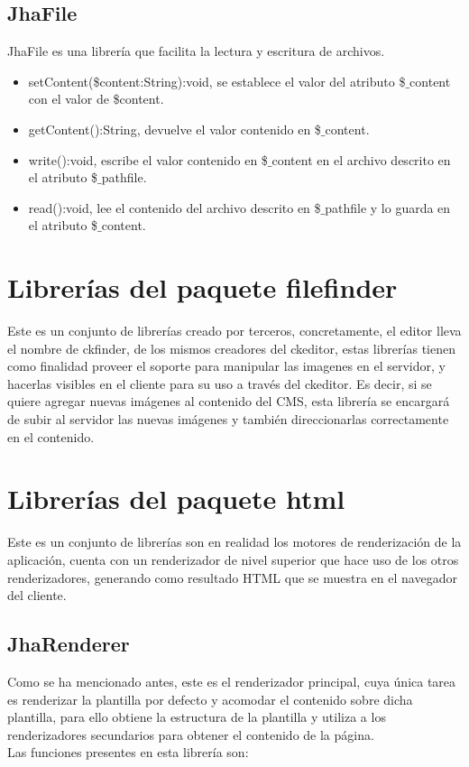\subsection{JhaFile}
JhaFile es una librer\'ia que facilita la lectura y escritura de archivos.
\begin{itemize}
\item \textsf{setContent(\$content:String):void}, se establece el valor del atributo \textsf{\$$\_$content} con el valor de \textsf{\$content}.
\item \textsf{getContent():String}, devuelve el valor contenido en \textsf{\$$\_$content}.
\item \textsf{write():void}, escribe el valor contenido en \textsf{\$$\_$content} en el archivo descrito en el atributo \textsf{\$$\_$pathfile}.
\item \textsf{read():void}, lee el contenido del archivo descrito en \textsf{\$$\_$pathfile} y lo guarda en el atributo \textsf{\$$\_$content}.
\end{itemize}

\section{Librer\'ias del paquete \textsf{filefinder}}
Este es un conjunto de librer\'ias creado por terceros, concretamente, el editor lleva el nombre de ckfinder, de los mismos creadores del ckeditor, estas librer\'ias tienen como finalidad proveer el soporte para manipular las imagenes en el servidor, y hacerlas visibles en el cliente para su uso a trav\'es del ckeditor. Es decir, si se quiere agregar nuevas im\'agenes al contenido del CMS, esta librer\'ia se encargar\'a de subir al servidor las nuevas im\'agenes y tambi\'en direccionarlas correctamente en el contenido.

\section{Librer\'ias del paquete \textsf{html}}
Este es un conjunto de librer\'ias son en realidad los motores de renderizaci\'on de la aplicaci\'on, cuenta con un renderizador de nivel superior que hace uso de los otros renderizadores, generando como resultado HTML que se muestra en el navegador del cliente.

\subsection{JhaRenderer}
Como se ha mencionado antes, este es el renderizador principal, cuya \'unica tarea es renderizar la plantilla por defecto y acomodar el contenido sobre dicha plantilla, para ello obtiene la estructura de la plantilla y utiliza a los renderizadores secundarios para obtener el contenido de la p\'agina.\\
Las funciones presentes en esta librer\'ia son:

